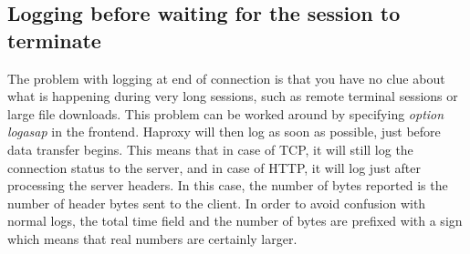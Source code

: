 
\subsection{Logging before waiting for the session to terminate}

The problem with logging at end of connection is that you have no clue about
what is happening during very long sessions, such as remote terminal sessions
or large file downloads. This problem can be worked around by specifying
\emph{option logasap} in the frontend. Haproxy will then log as soon as possible,
just before data transfer begins. This means that in case of TCP, it will still
log the connection status to the server, and in case of HTTP, it will log just
after processing the server headers. In this case, the number of bytes reported
is the number of header bytes sent to the client. In order to avoid confusion
with normal logs, the total time field and the number of bytes are prefixed
with a \CHAR{+} sign which means that real numbers are certainly larger.

